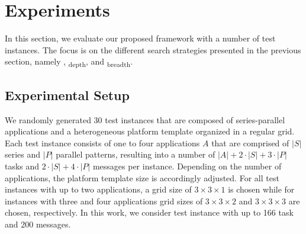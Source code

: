 \section{Experiments}
\label{sec:experiments}

In this section, we evaluate our proposed framework with a number of test instances. The focus is on the different search strategies presented in the previous section, namely \hybrid, \theory\textsubscript{depth}, and \theory\textsubscript{breadth}. %
\subsection{Experimental Setup}
We randomly generated 30 test instances that are composed of series-parallel applications and a heterogeneous platform template organized in a regular grid. Each test instance consists of one to four applications $A$ that are comprised of $\lvert S\rvert$ series and $\lvert P\rvert$ parallel patterns, resulting into a number of $\lvert A\rvert + 2\cdot \lvert S\rvert+3\cdot\lvert P\rvert$ tasks and $2\cdot\lvert S\rvert+4\cdot\lvert P\rvert$ messages per instance. Depending on the number of applications, the platform template size is accordingly adjusted. For all test instances with up to two applications, a grid size of $3\times3\times1$ is chosen while for instances with three and four applications grid sizes of $3\times3\times2$ and $3\times3\times3$ are chosen, respectively. In this work, we consider test instance with up to 166 task and 200 messages. 


